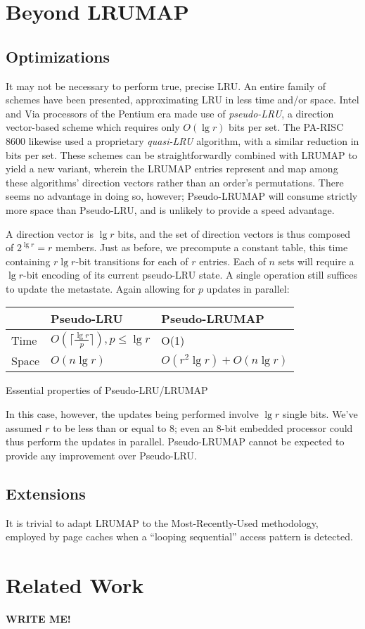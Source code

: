 \documentclass[letterpaper,10pt]{article}
\makeatletter
\newenvironment{tablehere}
{\def\@captype{table}}
{}
\makeatother
\begin{document}
\begin{multicols}{2}
\section{Beyond LRUMAP}
\subsection{Optimizations}
It may not be necessary to perform true, precise LRU. An entire family of
schemes have been presented, approximating LRU in less time and/or space.
Intel\cite{shanley} and Via processors of the Pentium era made use of
\textit{pseudo-LRU}, a direction vector-based scheme which requires only
$O(\lg{r})$ bits per set\cite{handy}. The PA-RISC 8600\cite{hurd} likewise used
a proprietary \textit{quasi-LRU} algorithm, with a similar reduction in bits
per set. These schemes can be straightforwardly combined with LRUMAP to yield a
new variant, wherein the LRUMAP entries represent and map among these
algorithms' direction vectors rather than an order's permutations. There seems
no advantage in doing so, however; Pseudo-LRUMAP will consume strictly more space
than Pseudo-LRU, and is unlikely to provide a speed advantage.

A direction vector is $\lg{r}$ bits, and the set of direction vectors is thus
composed of $2^{\lg{r}}=r$ members. Just as before, we precompute a constant
table, this time containing $r \lg{r}$-bit transitions for each of $r$
entries. Each of $n$ sets will require a $\lg{r}$-bit encoding of its current
pseudo-LRU state. A single operation still suffices to update the metastate.
Again allowing for $p$ updates in parallel:
\begin{center}
\begin{tablehere}
	\begin{tabular}{|l|l|l|}
	\hline
	& Pseudo-LRU & Pseudo-LRUMAP \\
	\hline
	Time & $O(\lceil\frac{\lg{r}}{p}\rceil), {p}\le{\lg{r}}$ & O(1) \\
	\hline
	Space & $O(n\lg{r})$ & $O(r^{2}\lg{r}) + O(n\lg{r})$ \\
	\hline
	\end{tabular}
	\caption{Essential properties of Pseudo-LRU/LRUMAP}
	\label{tab:pseudolru}
\end{tablehere}
\end{center}
In this case, however, the updates being performed involve $\lg{r}$ single bits.
We've assumed $r$ to be less than or equal to 8; even an 8-bit embedded processor
could thus perform the updates in parallel. Pseudo-LRUMAP cannot be expected to
provide any improvement over Pseudo-LRU.
\subsection{Extensions}
It is trivial to adapt LRUMAP to the Most-Recently-Used methodology, employed
by page caches when a ``looping sequential''\cite{dewitt} access pattern is
detected.
\section{Related Work}
\textbf{WRITE ME!}


\end{multicols}
\end{document}
